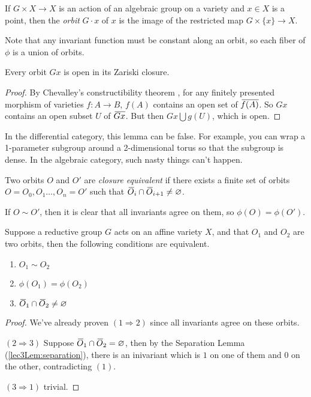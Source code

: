 \begin{definition}
 If $G\times X\to X$ is an action of an algebraic group on a variety and $x\in X$ is a point, then the \emph{orbit} $G\cdot x$ of $x$ is the image of the restricted map $G\times \{x\}\to X$. 
\end{definition}
Note that any invariant function must be constant along an orbit, so each fiber of $\phi$ is a union of orbits.
\begin{lemma}\label{lec3Lem:open_in_closure}
  Every orbit $G x$ is open in its Zariski closure.
\end{lemma}
\begin{proof}
 By Chevalley's constructibility theorem \cite[Theorem IV$_\text{1}$.1.8.4 and Proposition 0$_\text{III}$.9.2.2]{ega}, for any finitely presented morphism of varieties $f\colon A\to B$, $f(A)$ contains an open set of $\bbar{f(A)}$. So $Gx$ contains an open subset $U$ of $\bbar{Gx}$. But then $Gx\bigcup g(U)$, which is open.
\end{proof}
\begin{remark}
 In the differential category, this lemma can be false. For example, you can wrap a 1-parameter subgroup around a 2-dimensional torus so that the subgroup is dense. In the algebraic category, such nasty things can't happen.
\end{remark}
\begin{definition}
 Two orbits $O$ and $O'$ are \emph{closure equivalent} if there exists a finite set of orbits $O=O_0,O_1\dots, O_n=O'$ such that $\bbar O_i\cap \bbar O_{i+1}\neq \varnothing$.
\end{definition}
If $O\sim O'$, then it is clear that all invariants agree on them, so $\phi(O)=\phi(O')$.
\begin{proposition}\label{lec3Prop:orbit_closure}
 Suppose a reductive group $G$ acts on an affine variety $X$, and that $O_1$ and $O_2$ are two orbits, then the following conditions are equivalent.
 \begin{enumerate}
  \item $O_1\sim O_2$
  \item $\phi(O_1)=\phi(O_2)$
  \item $\bbar O_1\cap \bbar O_2\neq\varnothing$
 \end{enumerate}
\end{proposition}
\begin{proof}
 We've already proven $(1\Rightarrow 2)$ since all invariants agree on these orbits.
 
 $(2\Rightarrow 3)$ Suppose $\bbar O_1\cap \bbar O_2=\varnothing$, then by the Separation Lemma (\ref{lec3Lem:separation}), there is an inivariant which is $1$ on one of them and $0$ on the other, contradicting $(1)$.
 
 $(3\Rightarrow 1)$ trivial.
\end{proof}
